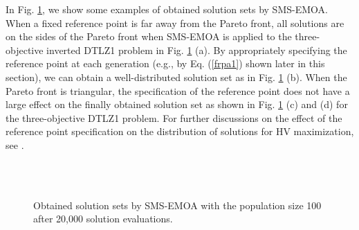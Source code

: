 \documentclass[conference]{IEEEtran}
\begin{document}
In Fig. \ref{rpa2}, we show some examples of obtained solution sets by SMS-EMOA. 
When a fixed reference point is far away from the Pareto front, 
all solutions are on the sides of the Pareto front when SMS-EMOA is 
applied to the three-objective inverted DTLZ1 problem \cite{invertedDTLZ1} in Fig. \ref{rpa2} (a). 
By appropriately specifying the reference point at each generation 
(e.g., by Eq. (\ref{frpa1}) shown later in this section), 
we can obtain a well-distributed solution set as in Fig. \ref{rpa2} (b). 
When the Pareto front is triangular, 
the specification of the reference point does not have a large effect 
on the finally obtained solution set as shown in Fig. \ref{rpa2} (c) and (d) for the three-objective DTLZ1 problem. 
For further discussions on the effect of the reference point specification 
on the distribution of solutions for HV maximization, see \cite{hisao:RPexplanation, hisao:RPspecify, hisao:dynamic}.

\begin{figure}[!t]
  \centering
  \quad
  \\
  \quad
  \\
  \caption{Obtained solution sets by SMS-EMOA with the population size 100 after 20,000 solution evaluations.
  }
  \label{rpa2}
\end{figure}
\end{document}
